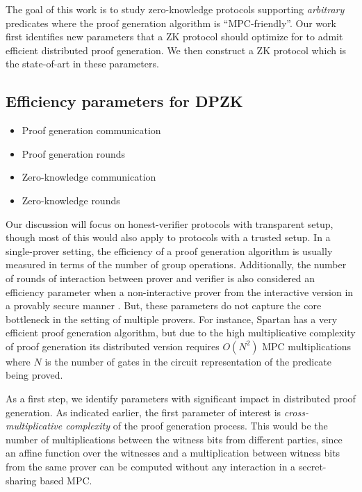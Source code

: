 The goal of this work is to study zero-knowledge protocols supporting \textit{arbitrary} predicates where the proof generation algorithm is ``MPC-friendly''. %
Our work first identifies new parameters that a ZK protocol should optimize for to admit efficient distributed proof generation. We then construct a ZK protocol which is the state-of-art in these parameters.

\subsection{Efficiency parameters for DPZK}
\begin{itemize}
\item Proof generation communication
\item Proof generation rounds
\item Zero-knowledge communication
\item Zero-knowledge rounds
\end{itemize}

Our discussion will focus on honest-verifier protocols with transparent setup, though most of this would also apply to protocols with a trusted setup. %
In a single-prover setting, the efficiency of a proof generation algorithm is usually measured in terms of the number of group operations. Additionally, the number of rounds of interaction between prover and verifier is also considered an efficiency parameter when a non-interactive prover from the interactive version in a provably secure manner \cite{BCS16}. But, these parameters do not capture the core bottleneck in the setting of multiple provers. For instance, Spartan \cite{spartan} has a very efficient proof generation algorithm, but due to the high multiplicative complexity of proof generation its distributed version requires $O(N^2)$ MPC multiplications where $N$ is the number of gates in the circuit representation of the predicate being proved. %

As a first step, we identify parameters with significant impact in distributed proof generation. 
As indicated earlier, the first parameter of interest is \textit{cross-multiplicative complexity} of the proof generation process. 
This would be the number of multiplications between the witness bits from different parties, since an affine function over the witnesses and a multiplication between witness bits from the same prover can be computed without any interaction in a secret-sharing based MPC.

